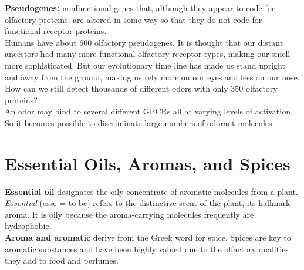 \documentclass{article}
\begin{document}
\textbf{Pseudogenes:} nonfunctional genes that, although they appear to code for olfactory proteins, are altered in some way so that they do not code for functional receptor proteins. \\

\noindent Humans have about 600 olfactory pseudogenes. It is thought that our distant ancestors had many more functional olfactory receptor types, making our smell more sophisticated. But our evolutionary time line has made us stand upright and away from the ground, making us rely more on our eyes and less on our nose. \\

\noindent How can we still detect thousands of different odors with only 350 olfactory proteins? \\
An odor may bind to several different GPCRs all at varying levels of activation. So it becomes possible to discriminate large numbers of odorant molecules. \\

\newpage
\section{Essential Oils, Aromas, and Spices}

\textbf{Essential oil} designates the oily concentrate of aromatic molecules from a plant. \textit{Essential} (esse = to be) refers to the distinctive scent of the plant, its hallmark aroma. It is oily because the aroma-carrying molecules frequently are hydrophobic.\\

\textbf{Aroma and aromatic} derive from the Greek word for spice. Spices are key to aromatic substances and have been highly valued due to the olfactory qualities they add to food and perfumes. \\
\end{document}

